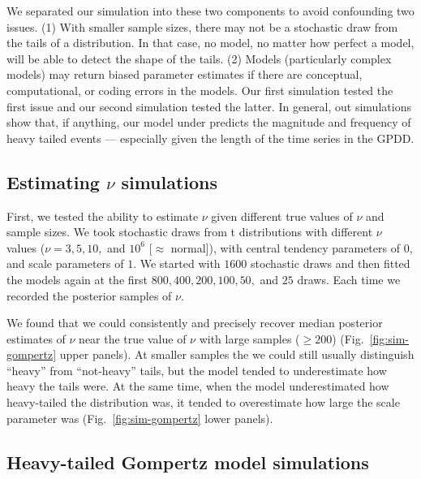 We separated our simulation into these two components to avoid confounding two issues. (1) With smaller sample sizes, there may not be a stochastic draw from the tails of a distribution. In that case, no model, no matter how perfect a model, will be able to detect the shape of the tails. (2) Models (particularly complex models) may return biased parameter estimates if there are conceptual, computational, or coding errors in the models. Our first simulation tested the first issue and our second simulation tested the latter. In general, out simulations show that, if anything, our model under predicts the magnitude and frequency of heavy tailed events --- especially given the length of the time series in the GPDD.

\subsection{Estimating $\nu$ simulations}

First, we tested the ability to estimate $\nu$ given different true values of $\nu$ and sample sizes. We took stochastic draws from t distributions with different $\nu$ values ($\nu = 3, 5, 10,$ and $10^6$ [$\approx$ normal]), with central tendency parameters of $0$, and scale parameters of $1$. We started with $1600$ stochastic draws and then fitted the models again at the first $800, 400, 200, 100, 50,$ and $25$ draws. Each time we recorded the posterior samples of $\nu$.

We found that we could consistently and precisely recover median posterior estimates of $\nu$ near the true value of $\nu$ with large samples ($\ge 200$) (Fig.~\ref{fig:sim-gompertz} upper panels). At smaller samples the we could still usually distinguish ``heavy'' from ``not-heavy'' tails, but the model tended to underestimate how heavy the tails were. At the same time, when the model underestimated how heavy-tailed the distribution was, it tended to overestimate how large the scale parameter was (Fig.~\ref{fig:sim-gompertz} lower panels).

\subsection{Heavy-tailed Gompertz model simulations}

